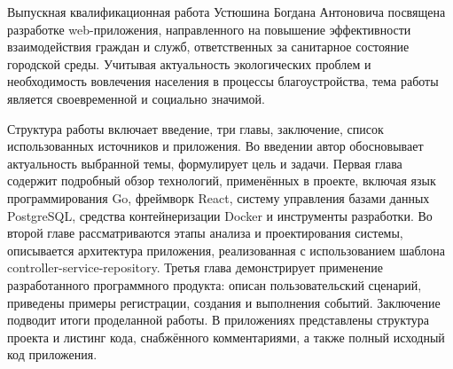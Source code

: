 \documentclass[critique]{SCWorks}
\begin{document}

\date{2025}

\maketitle






\sloppy

Выпускная квалификационная работа Устюшина Богдана Антоновича посвящена 
разработке web-приложения, направленного на повышение эффективности 
взаимодействия граждан и служб, ответственных за санитарное состояние 
городской среды. Учитывая актуальность экологических проблем и необходимость 
вовлечения населения в процессы благоустройства, тема работы является 
своевременной и социально значимой.

Структура работы включает введение, три главы, заключение, список 
использованных источников и приложения. Во введении автор обосновывает 
актуальность выбранной темы, формулирует цель и задачи. Первая глава 
содержит подробный обзор технологий, применённых в проекте, включая язык 
программирования Go, фреймворк React, систему управления базами данных 
PostgreSQL, средства контейнеризации Docker и инструменты разработки. Во 
второй главе рассматриваются этапы анализа и проектирования системы, 
описывается архитектура приложения, реализованная с использованием шаблона 
controller-service-repository. Третья глава демонстрирует применение 
разработанного программного продукта: описан пользовательский сценарий, 
приведены примеры регистрации, создания и выполнения событий. Заключение 
подводит итоги проделанной работы. В приложениях представлены структура 
проекта и листинг кода, снабжённого комментариями, а также полный исходный код
приложения.
\end{document}
